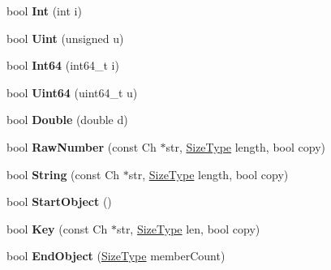 \begin{DoxyCompactItemize}
bool {\bfseries Int} (int i)
\item 
\mbox{\label{class_generic_schema_validator_aa688665c5274f93543c84a4b6cabe8da}} 
bool {\bfseries Uint} (unsigned u)
\item 
\mbox{\label{class_generic_schema_validator_ac5a9e416e18129a7b787f251019a828f}} 
bool {\bfseries Int64} (int64\+\_\+t i)
\item 
\mbox{\label{class_generic_schema_validator_abfc56c58cf0b65318e376fc5f2879292}} 
bool {\bfseries Uint64} (uint64\+\_\+t u)
\item 
\mbox{\label{class_generic_schema_validator_aed0532dbda3ac6f3ca7196af06066b86}} 
bool {\bfseries Double} (double d)
\item 
\mbox{\label{class_generic_schema_validator_ae4f024145421d2c1dde08a9de528722a}} 
bool {\bfseries Raw\+Number} (const Ch $\ast$str, \hyperlink{rapidjson_8h_a5ed6e6e67250fadbd041127e6386dcb5}{Size\+Type} length, bool copy)
\item 
\mbox{\label{class_generic_schema_validator_a33cf3f83307a8fea38c3238ef75c3d58}} 
bool {\bfseries String} (const Ch $\ast$str, \hyperlink{rapidjson_8h_a5ed6e6e67250fadbd041127e6386dcb5}{Size\+Type} length, bool copy)
\item 
\mbox{\label{class_generic_schema_validator_a59972d612c3d37aae9a30222e428d216}} 
bool {\bfseries Start\+Object} ()
\item 
\mbox{\label{class_generic_schema_validator_a6d08b458216ec4a09eed9d94800d05c1}} 
bool {\bfseries Key} (const Ch $\ast$str, \hyperlink{rapidjson_8h_a5ed6e6e67250fadbd041127e6386dcb5}{Size\+Type} len, bool copy)
\item 
\mbox{\label{class_generic_schema_validator_aa89e14f0f731f6acdec22a0f7e003037}} 
bool {\bfseries End\+Object} (\hyperlink{rapidjson_8h_a5ed6e6e67250fadbd041127e6386dcb5}{Size\+Type} member\+Count)
\item 

\end{DoxyCompactItemize}
